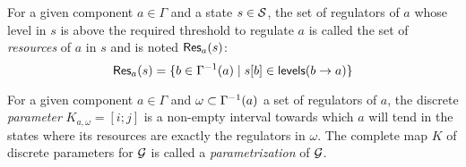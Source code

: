 
\begin{definition}\label{def:resources}
For a given component $a \in \Gamma$ and a state $s \in \mathcal{S}$,
the set of regulators of $a$ whose level in $s$ is above the required threshold to regulate $a$
is called the set of \emph{resources} of $a$ in $s$ and is noted $\mathsf{Res}_{a}(s)$:
$$\mathsf{Res}_{a}(s) = \{ b \in \Gamma^{-1}(a) \mid {s[b]} \in \mathsf{levels}(b\rightarrow a) \}$$
\end{definition}

\begin{definition}\label{def:param}
For a given component $a \in \Gamma$ and $\omega \subset \Gamma^{-1}(a)$ a set of regulators of $a$,
the discrete \emph{parameter} $K_{a,\omega} = [i; j]$ is a non-empty interval towards which $a$ will tend
in the states where its resources are exactly the regulators in $\omega$.
The complete map $K$ of discrete parameters for $\mathcal{G}$ is called a \emph{parametrization} of $\mathcal{G}$.
\end{definition}


